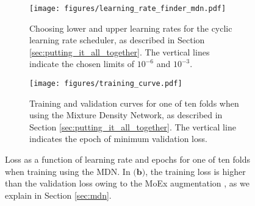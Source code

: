 \begin{figure*}
    \centering
    \begin{minipage}{.97\textwidth}
        \begin{subfigure}{0.49\textwidth}
            \centering
            \texttt{[image: figures/learning\_rate\_finder\_mdn.pdf]}
            \caption{Choosing lower and upper learning rates for the cyclic learning rate scheduler, as described in Section \ref{sec:putting_it_all_together}. The vertical lines indicate the chosen limits of $10^{-6}$ and $10^{-3}$.}
            \label{fig:mdn_find_lr}
        \end{subfigure}
        \hfill
        \begin{subfigure}{0.49\textwidth}
            \centering
            \texttt{[image: figures/training\_curve.pdf]}
            \caption{Training and validation curves for one of ten folds when using the Mixture Density Network, as described in Section \ref{sec:putting_it_all_together}. The vertical line indicates the epoch of minimum validation loss.}
            \label{fig:mdn_training_curve}
        \end{subfigure}
        \caption{Loss as a function of learning rate and epochs for one of ten folds when training using the MDN. In $\textbf{(b)}$, the training loss is higher than the validation loss owing to the MoEx augmentation \citep{moex}, as we explain in Section \ref{sec:mdn}.}
        \label{fig:mdn_ancillary}
    \end{minipage}


\end{figure*}
